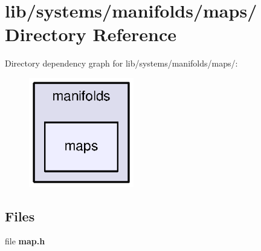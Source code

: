 \section{lib/systems/manifolds/maps/ \-Directory \-Reference}
\label{dir_8a026249474984152a40109727557232}
\-Directory dependency graph for lib/systems/manifolds/maps/\-:\nopagebreak
\begin{figure}[H]
\begin{center}
\leavevmode
\includegraphics[width=130pt]{dir_8a026249474984152a40109727557232_dep}
\end{center}
\end{figure}
\subsection*{\-Files}
\begin{DoxyCompactItemize}
\item 
file {\bf map.\-h}
\end{DoxyCompactItemize}
